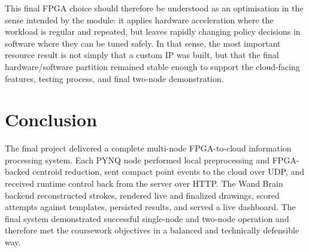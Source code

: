 \documentclass[10pt,a4paper]{article}
\begin{document}
This final FPGA choice should therefore be understood as an optimisation in the
sense intended by the module: it applies hardware acceleration where the
workload is regular and repeated, but leaves rapidly changing policy decisions
in software where they can be tuned safely. In that sense, the most important
resource result is not simply that a custom IP was built, but that the final
hardware/software partition remained stable enough to support the cloud-facing
features, testing process, and final two-node demonstration.

\section{Conclusion}

The final project delivered a complete multi-node FPGA-to-cloud information
processing system. Each PYNQ node performed local preprocessing and FPGA-backed
centroid reduction, sent compact point events to the cloud over UDP, and
received runtime control back from the server over HTTP. The Wand Brain backend
reconstructed strokes, rendered live and finalized drawings, scored attempts
against templates, persisted results, and served a live dashboard. The final
system demonstrated successful single-node and two-node operation and therefore
met the coursework objectives in a balanced and technically defensible way.
\end{document}
